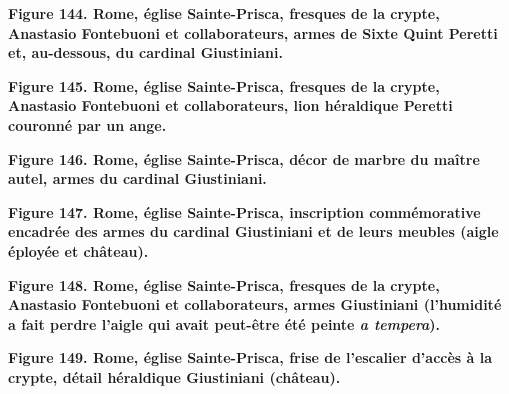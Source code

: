 \documentclass[12pt,twoside,openany]{book}
\begin{document}
\begin{center}
\par\small \textbf{Figure 144. Rome, église Sainte-Prisca, fresques de la crypte, Anastasio Fontebuoni et collaborateurs, armes de Sixte Quint Peretti et, au-dessous, du cardinal Giustiniani.}
\end{center}

\begin{center}
\par\small \textbf{Figure 145. Rome, église Sainte-Prisca, fresques de la crypte, Anastasio Fontebuoni et collaborateurs, lion héraldique Peretti couronné par un ange.}
\end{center}

\begin{center}
\par\small \textbf{Figure 146. Rome, église Sainte-Prisca, décor de marbre du maître autel, armes du cardinal Giustiniani.}
\end{center}

\begin{center}
\par\small \textbf{Figure 147. Rome, église Sainte-Prisca, inscription commémorative encadrée des armes du cardinal Giustiniani et de leurs meubles (aigle éployée et château).}
\end{center}

\begin{center}
\par\small \textbf{Figure 148. Rome, église Sainte-Prisca, fresques de la crypte, Anastasio Fontebuoni et collaborateurs, armes Giustiniani (l’humidité a fait perdre l’aigle qui avait peut-être été peinte \textit{a tempera}).}
\end{center}

\begin{center}
\par\small \textbf{Figure 149. Rome, église Sainte-Prisca, frise de l’escalier d’accès à la crypte, détail héraldique Giustiniani (château).}
\end{center}
\end{document}
